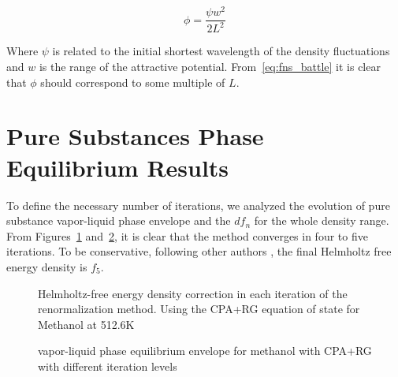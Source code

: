 \documentclass[preprint,12pt,3p]{elsarticle}
\begin{document}
\begin{equation} \label{eq:fns_battle}
    \phi = \frac{\psi w^2}{2L^2}
\end{equation}

    Where $\psi$ is related to the initial shortest wavelength of the density fluctuations and $w$ is the range of the attractive potential. From~\ref{eq:fns_battle} it is clear that $\phi$ should correspond to some multiple of $L$.
    
\section{Pure Substances Phase Equilibrium Results}

	To define the necessary number of iterations, we analyzed the evolution of pure substance vapor-liquid phase envelope and the $df_{n}$ for the whole density range. From Figures~\ref{fig:dfn} and~\ref{fig:PV_evol}, it is clear that the method converges in four to five iterations. To be conservative, following other authors  \cite{llovell2004thermodynamic,cai2004thermodynamics,pcm2017application}, the final Helmholtz free energy density is $f_{5}$.
	
\begin{figure}[h!]
\centering
\captionsetup{justification=centering}
\caption{Helmholtz-free energy density correction in each iteration of the renormalization method. Using the CPA+RG equation of state for Methanol at 512.6K}
\label{fig:dfn}
\end{figure}
	
\begin{figure}[h!]
\centering
\captionsetup{justification=centering}
\caption{vapor-liquid phase equilibrium envelope for methanol with CPA+RG with different iteration levels}
\label{fig:PV_evol}
\end{figure}
\end{document}

